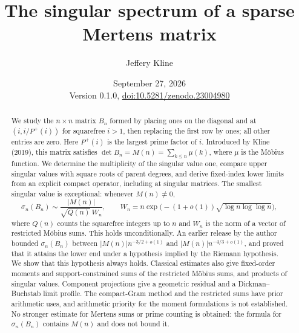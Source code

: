 \documentclass[11pt]{article}
\title{The singular spectrum of a sparse Mertens matrix}
\author{Jeffery Kline}
\date{September 27, 2026\\[3pt]\small Version 0.1.0, \href{https://doi.org/10.5281/zenodo.23004980}{doi:10.5281/zenodo.23004980}}
\numberwithin{equation}{section}
\theoremstyle{definition}
\theoremstyle{remark}
\begin{document}
\maketitle
\begin{abstract}
We study the $n\times n$ matrix $B_n$ formed by placing ones on the diagonal and at $(i,i/P^+(i))$ for squarefree $i>1$, then replacing the first row by ones; all other entries are zero. Here $P^+(i)$ is the largest prime factor of $i$. Introduced by Kline (2019), this matrix satisfies $\det B_n=M(n)=\sum_{k\le n}\mu(k)$, where $\mu$ is the M\"obius function. We determine the multiplicity of the singular value one, compare upper singular values with square roots of parent degrees, and derive fixed-index lower limits from an explicit compact operator, including at singular matrices. The smallest singular value is exceptional: whenever $M(n)\ne0$,
\[
 \sigma_n(B_n)\sim\frac{|M(n)|}{\sqrt{Q(n)}\,W_n},\qquad
 W_n=n\exp\bigl(-(1+o(1))\sqrt{\log n\log\log n}\bigr),
\]
where $Q(n)$ counts the squarefree integers up to $n$ and $W_n$ is the norm of a vector of restricted M\"obius sums. This holds unconditionally. An earlier release by the author bounded $\sigma_n(B_n)$ between $|M(n)|n^{-3/2+o(1)}$ and $|M(n)|n^{-4/3+o(1)}$, and proved that it attains the lower end under a hypothesis implied by the Riemann hypothesis. We show that this hypothesis always holds. Classical estimates also give fixed-order moments and support-constrained sums of the restricted M\"obius sums, and products of singular values. Component projections give a geometric residual and a Dickman--Buchstab limit profile. The compact-Gram method and the restricted sums have prior arithmetic uses, and arithmetic priority for the moment formulations is not established. No stronger estimate for Mertens sums or prime counting is obtained: the formula for $\sigma_n(B_n)$ contains $M(n)$ and does not bound it.
\end{abstract}
\tableofcontents







\appendix


\end{document}
